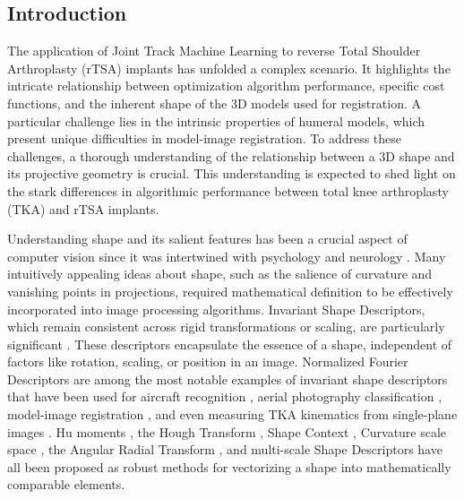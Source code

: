 \subsection{Introduction}


The application of Joint Track Machine Learning to reverse Total Shoulder Arthroplasty (rTSA) implants has unfolded a complex scenario.
It highlights the intricate relationship between optimization algorithm performance, specific cost functions, and the inherent shape of the 3D models used for registration.
A particular challenge lies in the intrinsic properties of humeral models, which present unique difficulties in model-image registration.
To address these challenges, a thorough understanding of the relationship between a 3D shape and its projective geometry is crucial.
This understanding is expected to shed light on the stark differences in algorithmic performance between total knee arthroplasty (TKA) and rTSA implants.


Understanding shape and its salient features has been a crucial aspect of computer vision since it was intertwined with psychology and neurology \cite{attneaveInformationalAspectsVisual1954,attneaveQuantitativeStudyShape1956}.
Many intuitively appealing ideas about shape, such as the salience of curvature and vanishing points in projections, required mathematical definition to be effectively incorporated into image processing algorithms.
Invariant Shape Descriptors, which remain consistent across rigid transformations or scaling, are particularly significant \cite{zhangReviewShapeRepresentation2004}.
These descriptors encapsulate the essence of a shape, independent of factors like rotation, scaling, or position in an image.
Normalized Fourier Descriptors are among the most notable examples of invariant shape descriptors that have been used for aircraft recognition \cite{wallaceEfficientThreedimensionalAircraft1980,wallaceAnalysisThreedimensionalMovement1980,richardIdentificationThreeDimensionalObjects1974}, aerial photography classification \cite{linClassificationPartial2D1987}, model-image registration \cite{zossoBiplanar2Dto3DRegistration2008}, and even measuring TKA kinematics from single-plane images \cite{banksAccurateMeasurementThreedimensional1996}.
Hu moments \cite{huVisualPatternRecognition1962}, the Hough Transform \cite{ballardGeneralizingHoughTransform1981}, Shape Context \cite{belongieShapeMatchingObject2002}, Curvature scale space \cite{koenderinkSurfaceShapeCurvature1992}, the Angular Radial Transform \cite{leeNewShapeDescription2012}, and multi-scale Shape Descriptors \cite{al-thelayaInShaDeInvariantShape2021} have all been proposed as robust methods for vectorizing a shape into mathematically comparable elements.

